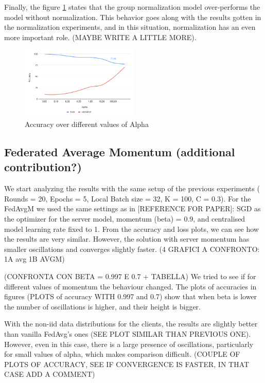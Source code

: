 \documentclass[twocolumn]{article}
\begin{document}
Finally, the figure \ref{AccAlpha} states that the group normalization model over-performs the model without normalization. This behavior goes along with the results gotten in the normalization experiments, and in this situation, normalization has an even more important role. (MAYBE WRITE A LITTLE MORE).


\begin{figure}
    \centering
    \includegraphics[width=0.5\textwidth,height=.3\textheight]{alphaAccuracy.png}
    \caption{Accuracy over different values of Alpha}
    \label{AccAlpha} 
\end{figure}


\subsection{Federated Average Momentum (additional contribution?)}
We start analyzing the results with the same setup of the previous experiments ( Rounds = 20, Epochs = 5, Local Batch size = 32, K = 100, C = 0.3).
For the FedAvgM we used the same settings as in [REFERENCE FOR PAPER]: SGD as the optimizer for the server model,  momentum (beta) = 0.9, and centralised model learning rate fixed to 1.
From the accuracy and loss plots, we can see how the results are very similar. However, the solution with server momentum has smaller oscillations and converges slightly faster. 
(4 GRAFICI A CONFRONTO: 1A avg 1B AVGM)

(CONFRONTA CON BETA = 0.997 E 0.7 + TABELLA)
We tried to see if for different values of momentum the behaviour changed. The plots of accuracies in figures (PLOTS of accuracy WITH 0.997 and 0.7) show that when beta is lower the number of oscillations is higher, and their height is bigger.

With the non-iid data distributions for the clients, the results are slightly better than vanilla FedAvg's ones (SEE PLOT SIMILAR THAN PREVIOUS ONE). However, even in this case, there is a large presence of oscillations, particularly for small values of alpha, which makes comparison difficult.
(COUPLE OF PLOTS OF ACCURACY, SEE IF CONVERGENCE IS FASTER, IN THAT CASE ADD A COMMENT)
\end{document}
